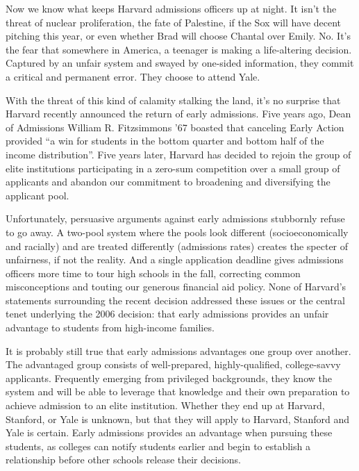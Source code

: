 
Now we know what keeps Harvard admissions officers up at night. It isn't the
threat of nuclear proliferation, the fate of Palestine, if the Sox will have
decent pitching this year, or even whether Brad will choose Chantal over
Emily. No. It's the fear that somewhere in America, a teenager is making a
life-altering decision. Captured by an unfair system and swayed by one-sided
information, they commit a critical and permanent error. They choose to
attend Yale.

With the threat of this kind of calamity stalking the land, it's no surprise
that Harvard recently announced the return of early admissions. Five years
ago, Dean of Admissions William R. Fitzsimmons ’67 boasted that canceling
Early Action provided ``a win for students in the bottom quarter and bottom
half of the income distribution''. Five years later, Harvard has decided to
rejoin the group of elite institutions participating in a zero-sum
competition over a small group of applicants and abandon our commitment to
broadening and diversifying the applicant pool.

Unfortunately, persuasive arguments against early admissions stubbornly
refuse to go away. A two-pool system where the pools look different
(socioeconomically and racially) and are treated differently (admissions
rates) creates the specter of unfairness, if not the reality. And a single
application deadline gives admissions officers more time to tour high schools
in the fall, correcting common misconceptions and touting our generous
financial aid policy. None of Harvard's statements surrounding the recent
decision addressed these issues or the central tenet underlying the 2006
decision: that early admissions provides an unfair advantage to students from
high-income families.

It is probably still true that early admissions advantages one group over
another. The advantaged group consists of well-prepared, highly-qualified,
college-savvy applicants. Frequently emerging from privileged backgrounds,
they know the system and will be able to leverage that knowledge and their
own preparation to achieve admission to an elite institution. Whether they
end up at Harvard, Stanford, or Yale is unknown, but that they will apply to
Harvard, Stanford and Yale is certain. Early admissions provides an advantage
when pursuing these students, as colleges can notify students earlier and
begin to establish a relationship before other schools release their
decisions.

